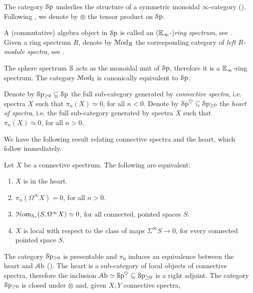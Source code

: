 \documentclass[10pt]{amsart}
\begin{document}
  The category $\mathcal{S}\mathrm{p}$ underlies the structure of a symmetric monoidal $\infty$-category (\cite[Corollary 4.8.2.19]{lurie2017ha}). Following \cite{lurie2017ha}, we denote by $\otimes$ the tensor product on $\mathcal{S}\mathrm{p}$.
  \begin{definition}
    A (commutative) algebra object in $\mathcal{S}\mathrm{p}$ is called an ($\mathbb{E}_\infty$-)\emph{ring spectrum}, see \cite[Definition 7.1.0.1]{lurie2017ha}. Given a ring spectrum $R$, denote by $\mathcal{M}\mathrm{od}_R$ the corresponding category of \emph{left $R$-module spectra}, see \cite[Definition 7.1.1.2]{lurie2017ha}. 
  \end{definition}
  \begin{remark}
    The sphere spectrum $\mathbb{S}$ acts as the monoidal unit of $\mathcal{S}\mathrm{p}$, therefore it is a $\mathbb{E}_\infty$-ring spectrum. The category $\mathcal{M}\mathrm{od}_{\mathbb{S}}$ is canonically equivalent to $\mathcal{S}\mathrm{p}$. 
  \end{remark}
    \begin{definition}
    Denote by $\mathcal{S}\mathrm{p}_{\geq0}\subseteq\mathcal{S}\mathrm{p}$ the full sub-category generated by \emph{connective spectra}, i.e. spectra $X$ such that $\pi_n(X)\simeq0$, for all $n<0$. Denote by $\mathcal{S}\mathrm{p}^\heartsuit\subseteq\mathcal{S}\mathrm{p}_{\geq0}$ the \emph{heart of spectra}, i.e. the full sub-category generated by spectra $X$ such that $\pi_n(X)\simeq0$, for all $n>0$.
  \end{definition}
  We have the following result relating connective spectra and the heart, which follow immediately.
  \begin{lemma}
  Let $X$ be a connective spectrum. The following are equivalent:
  \begin{enumerate}
    \item $X$ is in the heart. 
    \item $\pi_n(\Omega^\infty X)=0$, for all $n>0$.
    \item $\mathcal{H}\mathrm{om}_{\mathcal{S}_*}(S,\Omega^\infty X)\simeq0$, for all connected, pointed spaces $S$.
    \item $X$ is local with respect to the class of maps $\Sigma^\infty S\to0$, for every connected pointed space $S$.
  \end{enumerate}
  \end{lemma}

  The category $\mathcal{S}\mathrm{p}_{\geq0}$ is presentable and $\pi_0$ induces an equivalence between the heart and $\mathcal{A}\mathrm{b}$ (\cite[Proposition 1.4.3.6]{lurie2017ha}). The heart is a sub-category of local objects of connective spectra, therefore the inclusion $\mathcal{A}\mathrm{b}\simeq\mathcal{S}\mathrm{p}^\heartsuit\subseteq\mathcal{S}\mathrm{p}_{\geq0}$ is a right adjoint. The category $\mathcal{S}\mathrm{p}_{\geq0}$ is closed under $\otimes$ and, given $X,Y$ connective spectra, 
\end{document}
